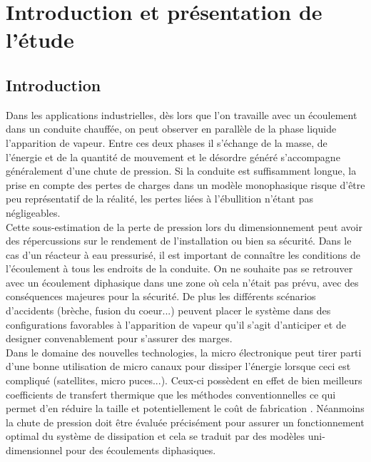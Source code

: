 \section{Introduction et présentation de l'étude\label{section:pres}}

\subsection{Introduction}

Dans les applications industrielles, dès lors que l'on travaille avec un écoulement dans un conduite chauffée, on peut observer en parallèle de la phase liquide l'apparition de vapeur. Entre ces deux phases il s'échange de la masse, de l'énergie et de la quantité de mouvement et le désordre généré s'accompagne généralement d'une chute de pression. Si la conduite est suffisamment longue, la prise en compte des pertes de charges dans un modèle monophasique risque d'être peu représentatif de la réalité, les pertes liées à l'ébullition n'étant pas négligeables.\\

Cette sous-estimation de la perte de pression lors du dimensionnement peut avoir des répercussions sur le rendement de l'installation ou bien sa sécurité. Dans le cas d'un réacteur à eau pressurisé, il est important de connaître les conditions de l'écoulement à tous les endroits de la conduite. On ne souhaite pas se retrouver avec un écoulement diphasique dans une zone où cela n'était pas prévu, avec des conséquences majeures pour la sécurité. De plus les différents scénarios d'accidents (brèche, fusion du coeur...) peuvent placer le système dans des configurations favorables à l'apparition de vapeur qu'il s'agit d'anticiper et de designer convenablement pour s'assurer des marges.\\

Dans le domaine des nouvelles technologies, la micro électronique peut tirer parti d'une bonne utilisation de micro canaux pour dissiper l'énergie lorsque ceci est compliqué (satellites, micro puces...). Ceux-ci possèdent en effet de bien meilleurs coefficients de transfert thermique que les méthodes conventionnelles ce qui permet d'en réduire la taille et potentiellement le coût de fabrication \cite{revellinAdiabaticTwophaseFrictional2007}. Néanmoins la chute de pression doit être évaluée précisément pour assurer un fonctionnement optimal du système de dissipation et cela se traduit par des modèles uni-dimensionnel pour des écoulements diphasiques. \\


